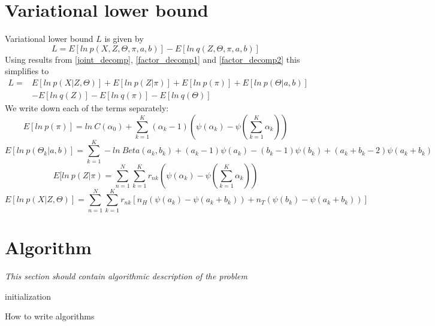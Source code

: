 \documentclass{article}
\newcommand\JointProb{p(X,Z,\Theta,\pi,a,b)}
\newcommand\Factorized{q(Z,\Theta,\pi,a,b)}
\newcommand\SumK{\sum_{k=1}^{K}}
\newcommand\SumN{\sum_{n=1}^{N}}
\begin{document}
\section{Variational lower bound}
Variational lower bound $L$ is given by 
\begin{equation}
    L = E[ln\:\JointProb{}] - E[ln\:\Factorized{}]
\end{equation}
Using results from \ref{joint_decomp}, \ref{factor_decomp1} and \ref{factor_decomp2}
this simplifies to
\begin{equation}
\begin{split}
    L =& E[ln\:p(X|Z,\Theta)] + E[ln\:p(Z|\pi)] + E[ln\:p(\pi)] + E[ln\:p(\Theta|a,b)] \\
    & -E[ln\:q(Z)] - E[ln\:q(\pi)] - E[ln\:q(\Theta)]
\end{split}        
\end{equation}
We write down each of the terms separately:
\begin{equation}
    E[ln\:p(\pi)] = ln\:C(\alpha_0)+\SumK (\alpha_k-1)(\psi(\alpha_k)-\psi(\SumK \alpha_k))
\end{equation}
\begin{equation}
    E[ln\:p(\Theta_k|a,b)]=\SumK -ln\:Beta(a_k,b_k)+(a_k-1)\psi(a_k)-(b_k-1)\psi(b_k)+(a_k+b_k-2)\psi(a_k+b_k)
\end{equation}
\begin{equation}
    E[ln\:p(Z|\pi) = \SumN\SumK r_{nk}(\psi(\alpha_k)-\psi(\SumK \alpha_k))
\end{equation}
\begin{equation}
    E[ln\:p(X|Z,\Theta)] = \SumN\SumK r_{nk}[n_H(\psi(a_k)-\psi(a_k+b_k))+n_T(\psi(b_k)-\psi(a_k+b_k))]
\end{equation}
\section{Algorithm}
\textit{This section should contain algorithmic description of the problem}
\begin{center}

\begin{algorithm}[H]
 initialization\;
 \caption{How to write algorithms}
\end{algorithm}
\end{center}
\end{document}

